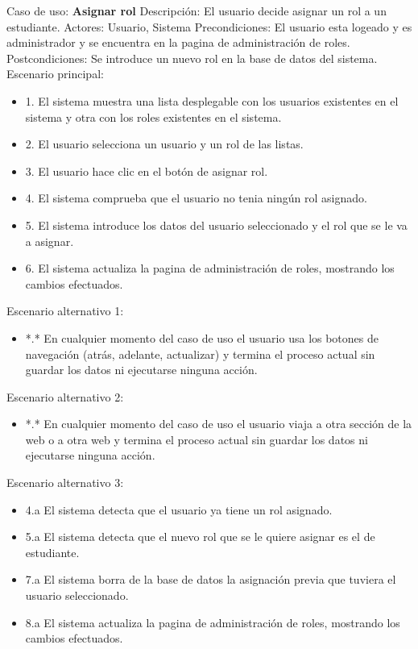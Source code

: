 Caso de uso: \textbf{Asignar rol}
\newline
Descripción: El usuario decide asignar un rol a un estudiante.
\newline
Actores: Usuario, Sistema
\newline
Precondiciones: El usuario esta logeado y es administrador y se encuentra en la pagina de administración de roles.
\newline
Postcondiciones: Se introduce un nuevo rol en la base de datos del sistema.
\newline
Escenario principal:
\begin{itemize}
	\item 1. El sistema muestra una lista desplegable con los usuarios existentes en el sistema y otra con los roles existentes en el sistema.
	\item 2. El usuario selecciona un usuario y un rol de las listas.
	\item 3. El usuario hace clic en el botón de asignar rol.
	\item 4. El sistema comprueba que el usuario no tenia ningún rol asignado.
	\item 5. El sistema introduce los datos del usuario seleccionado y el rol que se le va a asignar.
	\item 6. El sistema actualiza la pagina de administración de roles, mostrando los cambios efectuados.
\end{itemize}
Escenario alternativo 1: 
\begin{itemize}
	\item *.* En cualquier momento del caso de uso el usuario usa los botones de navegación (atrás, adelante, actualizar) y termina el proceso actual sin guardar los datos ni ejecutarse ninguna acción.
\end{itemize}
Escenario alternativo 2:
\begin{itemize}
	\item *.* En cualquier momento del caso de uso el usuario viaja a otra sección de la web o a otra web y termina el proceso actual sin guardar los datos ni ejecutarse ninguna acción.
\end{itemize}
Escenario alternativo 3:
\begin{itemize}
	\item 4.a El sistema detecta que el usuario ya tiene un rol asignado.
	\item 5.a El sistema detecta que el nuevo rol que se le quiere asignar es el de estudiante.
	\item 7.a El sistema borra de la base de datos la asignación previa que tuviera el usuario seleccionado.
	\item 8.a El sistema actualiza la pagina de administración de roles, mostrando los cambios efectuados.
\end{itemize}
